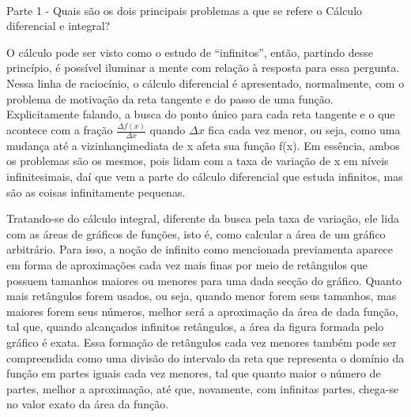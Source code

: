 \documentclass[exercícios_de_cálculo.tex]{subfiles}
\begin{document}
\paragraph{} Parte 1 - Quais são os dois principais problemas a que se refere o Cálculo diferencial e integral?
\begin{sol*}
	O cálculo pode ser visto como o estudo de ``infinitos'', então, partindo desse princípio, é poss\'ivel iluminar a mente com relação à resposta para essa pergunta. Nessa linha de racioc\'inio, o cálculo diferencial é apresentado, normalmente, com o problema de motivaç\~ao da reta tangente e do passo de uma funç\~ao. Explicitamente falando, a busca do ponto único para cada reta tangente e o que acontece com a fraç\~ao $\frac{\Delta{f(x)}}{\Delta{x}}$ quando $\Delta{x}$ fica cada vez menor, ou seja, como uma mudança até a vizinhanç\a imediata de x afeta sua funç\~ao f(x). Em essência, ambos os problemas s\~ao os mesmos, pois lidam com a taxa de variaç\~ao de x em n\'iveis infinitesimais, da\'i que vem a parte do cálculo diferencial que estuda infinitos, mas s\~ao as coisas infinitamente pequenas.

	Tratando-se do cálculo integral, diferente da busca pela taxa de variação, ele lida com as áreas de gráficos de funções, isto é, como calcular a área de um gráfico arbitrário. Para isso, a noção de infinito como mencionada previamenta aparece em forma de aproximações cada vez mais finas por meio de retângulos que possuem tamanhos maiores ou menores para uma dada secç\~ao do gráfico. Quanto mais retângulos forem usados, ou seja, quando menor forem seus tamanhos, mas maiores forem seus números, melhor será a aproximaç\~ao da área de dada funç\~ao, tal que, quando alcançados infinitos retângulos, a área da figura formada pelo gráfico é exata. Essa formaç\~ao de retângulos cada vez menores também pode ser compreendida como uma divis\~ao do intervalo da reta que representa o domínio da funç\~ao em partes iguais cada vez menores, tal que quanto maior o n\'umero de partes, melhor a aproximaç\~ao, até que, novamente, com infinitas partes, chega-se no valor exato da área da funç\~ao.
	\qedsymbol
\end{sol*}
\end{document}
